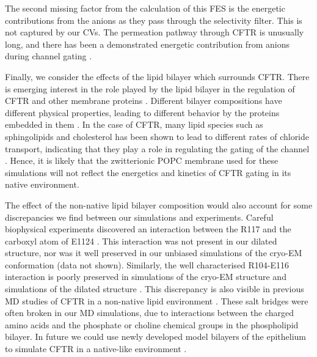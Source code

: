 The second missing factor from the calculation of this FES is the energetic contributions from the anions as they pass through the selectivity filter. This is not captured by our CVs. The permeation pathway through CFTR is unusually long, and there has been a demonstrated energetic contribution from anions during channel gating \cite{gong2004, gong2003, gong2003a, tabcharani1993, zhou2002, sorum2015, yeh2015}. 

Finally, we consider the effects of the lipid bilayer which surrounds CFTR. There is emerging interest in the role played by the lipid bilayer in the regulation of CFTR and other membrane proteins \cite{cottrill2020, lin2022, kapoor2021, farinha2018, cui2020}. Different bilayer compositions have different physical properties, leading to different behavior by the proteins embedded in them \cite{hickey2011}. In the case of CFTR, many lipid species such as sphingolipids and cholesterol has been shown to lead to different rates of chloride transport, indicating that they play a role in regulating the gating of the channel \cite{aureli2016, farinha2018, cottrill2020}. Hence, it is likely that the zwitterionic POPC membrane used for these simulations will not reflect the energetics and kinetics of CFTR gating in its native environment.

The effect of the non-native lipid bilayer composition would also account for some discrepancies we find between our simulations and experiments. Careful biophysical experiments discovered an interaction between the R117 and the carboxyl atom of E1124 \cite{simon2021}. This interaction was not present in our dilated structure, nor was it well preserved in our unbiased simulations of the cryo-EM conformation (data not shown). Similarly, the well characterised R104-E116 interaction is poorly preserved in simulations of the cryo-EM structure and simulations of the dilated structure \cite{cui2014}. This discrepancy is also visible in previous MD studies of CFTR in a non-native lipid environment \cite{zeng2021}. These salt bridges were often broken in our MD simulations, due to interactions between the charged amino acids and the phosphate or choline chemical groups in the phospholipid bilayer. In future we could use newly developed model bilayers of the epithelium to simulate CFTR in a native-like environment \cite{wilson2021}. 


